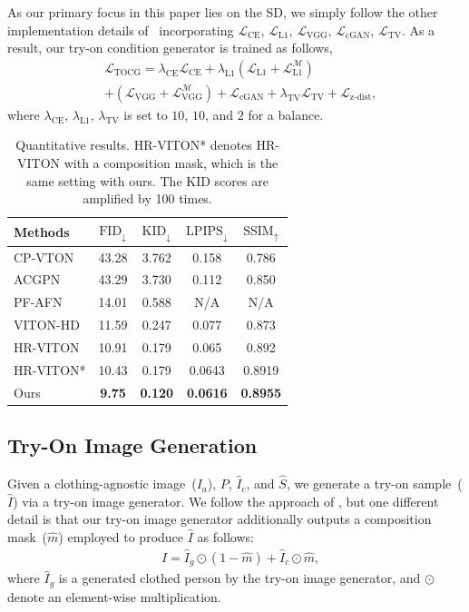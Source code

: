 \documentclass[letterpaper]{article} %
\begin{document}
As our primary focus in this paper lies on the SD, we simply follow the other implementation details of~\cite{lee2022hrviton} incorporating $\mathcal{L}_{\text{CE}}$, $\mathcal{L}_{\text{L1}}$, $\mathcal{L}_{\text{VGG}}$, $\mathcal{L}_{\text{cGAN}}$, $\mathcal{L}_{\text{TV}}$.
As a result, our try-on condition generator is trained as follows,
\begin{eqnarray}
    & \mathcal{L}_{\text{TOCG}} = \lambda_{\text{CE}}\mathcal{L}_{\text{CE}} + \lambda_{\text{L1}}(\mathcal{L}_{\text{L1}} + \mathcal{L}_{\text{L1}}^{\mathcal{M}})  
    \nonumber \\ & + (\mathcal{L}_{\text{VGG}} + \mathcal{L}_{\text{VGG}}^{\mathcal{M}}) + \mathcal{L}_{\text{cGAN}} + \lambda_{\text{TV}}\mathcal{L}_{\text{TV}} + \mathcal{L}_{\text{z-dist}},
\end{eqnarray}
where $\lambda_{\text{CE}}$, $\lambda_{\text{L1}}$, $\lambda_{\text{TV}}$ is set to $10$, $10$, and $2$ for a balance.

\begin{table}[t]
	\centering
	\begin{tabular}{l|cc|cc}
		\toprule
		Methods  & $\text{FID}_\downarrow$ & $\text{KID}_\downarrow$ & $\text{LPIPS}_\downarrow$ & $\text{SSIM}_\uparrow$ \\
		\midrule
		\midrule
        CP-VTON & 43.28 & 3.762 & 0.158 & 0.786 \\
		ACGPN & 43.29 & 3.730 & 0.112 & 0.850 \\
		PF-AFN & 14.01 & 0.588 & N/A & N/A \\
        \midrule
        VITON-HD & 11.59 & 0.247 & 0.077 & 0.873 \\
        HR-VITON & 10.91 & 0.179 & 0.065 & 0.892 \\
        HR-VITON*  & 10.43 & 0.179 & 0.0643 & 0.8919 \\
        Ours & \textbf{9.75} & \textbf{0.120} & \textbf{0.0616} & \textbf{0.8955} \\
		\bottomrule
	\end{tabular}
    \caption{Quantitative results. HR-VITON* denotes HR-VITON with a composition mask, which is the same setting with ours. The KID scores are amplified by 100 times.
    }
	\label{tb_overall_result}
\end{table}

\subsection{Try-On Image Generation}
\label{sec_try_on_image_gen}
Given a clothing-agnostic image~($I_a$), $P$, $\hat{I}_c$, and $\hat{S}$, we generate a try-on sample~($\hat{I}$) via a try-on image generator.
We follow the approach of \cite{lee2022hrviton}, but one different detail is that our try-on image generator additionally outputs a composition mask~($\hat{m}$) employed to produce $\hat{I}$ as follows:
\begin{eqnarray}
    & \hat{I} = \hat{I}_g \odot (1 - \hat{m}) + \hat{I}_c \odot \hat{m},
\end{eqnarray}
where $\hat{I}_g$ is a generated clothed person by the try-on image generator, and $\odot$ denote an element-wise multiplication.
\end{document}
